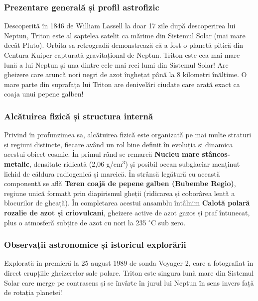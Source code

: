 \subsubsection*{Prezentare generală și profil astrofizic}
Descoperită în 1846 de William Lassell la doar 17 zile după descoperirea lui Neptun, Triton este al șaptelea satelit ca mărime din Sistemul Solar (mai mare decât Pluto). Orbita sa retrogradă demonstrează că a fost o planetă pitică din Centura Kuiper capturată gravitațional de Neptun. Triton este cea mai mare lună a lui Neptun și una dintre cele mai reci lumi din Sistemul Solar! Are gheizere care aruncă nori negri de azot înghețat până la 8 kilometri înălțime. O mare parte din suprafața lui Triton are denivelări ciudate care arată exact ca coaja unui pepene galben!

\subsubsection*{Alcătuirea fizică și structura internă}
Privind în profunzimea sa, alcătuirea fizică este organizată pe mai multe straturi și regiuni distincte, fiecare având un rol bine definit în evoluția și dinamica acestui obiect cosmic. În primul rând se remarcă \textbf{Nucleu mare stâncos-metalic}, densitate ridicată (2,06 g/cm$^3$) și posibil ocean subglaciar menținut lichid de căldura radiogenică și mareică. În strânsă legătură cu această componentă se află \textbf{Teren \guillemotleft{}coajă de pepene galben\guillemotright{} (Bubembe Regio)}, regiune unică formată prin diapirismul gheții (ridicarea și coborârea lentă a blocurilor de gheață). În completarea acestui ansamblu întâlnim \textbf{Calotă polară rozalie de azot și criovulcani}, gheizere active de azot gazos și praf întunecat, plus o atmosferă subțire de azot cu nori la 235 $^\circ$C sub zero.

\subsubsection*{Observații astronomice și istoricul explorării}
Explorată în premieră la 25 august 1989 de sonda Voyager 2, care a fotografiat în direct erupțiile gheizerelor sale polare. Triton este singura lună mare din Sistemul Solar care merge \guillemotleft{}pe contrasens\guillemotright{} și se învârte în jurul lui Neptun în sens invers față de rotația planetei!

